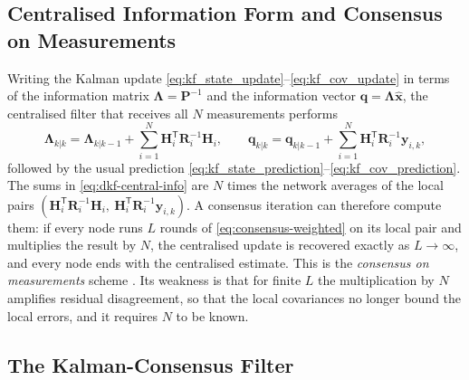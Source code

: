 \documentclass[graybox,envcountchap]{style/SNmono}
\begin{document}
\subsection{Centralised Information Form and Consensus on Measurements}
\label{subsec:mas-central-info}

Writing the Kalman update \eqref{eq:kf_state_update}--\eqref{eq:kf_cov_update} in terms of the information matrix $\mathbf{\Lambda}=\mathbf{P}^{-1}$ and the information vector $\mathbf{q}=\mathbf{\Lambda}\widehat{\mathbf{x}}$, the centralised filter that receives all $N$ measurements performs
\begin{equation}
\mathbf{\Lambda}_{k|k}=\mathbf{\Lambda}_{k|k-1}+\sum_{i=1}^{N}\mathbf{H}_i^{\mathsf T}\mathbf{R}_i^{-1}\mathbf{H}_i,\qquad
\mathbf{q}_{k|k}=\mathbf{q}_{k|k-1}+\sum_{i=1}^{N}\mathbf{H}_i^{\mathsf T}\mathbf{R}_i^{-1}\mathbf{y}_{i,k},
\label{eq:dkf-central-info}
\end{equation}
followed by the usual prediction \eqref{eq:kf_state_prediction}--\eqref{eq:kf_cov_prediction}. The sums in \eqref{eq:dkf-central-info} are $N$ times the network averages of the local pairs $(\mathbf{H}_i^{\mathsf T}\mathbf{R}_i^{-1}\mathbf{H}_i,\ \mathbf{H}_i^{\mathsf T}\mathbf{R}_i^{-1}\mathbf{y}_{i,k})$. A consensus iteration can therefore compute them: if every node runs $L$ rounds of \eqref{eq:consensus-weighted} on its local pair and multiplies the result by $N$, the centralised update is recovered exactly as $L\to\infty$, and every node ends with the centralised estimate. This is the \emph{consensus on measurements} scheme \cite{olfatisaber2005_dkf_embedded}. Its weakness is that for finite $L$ the multiplication by $N$ amplifies residual disagreement, so that the local covariances no longer bound the local errors, and it requires $N$ to be known.

\subsection{The Kalman-Consensus Filter}
\label{subsec:mas-kcf}
\end{document}
